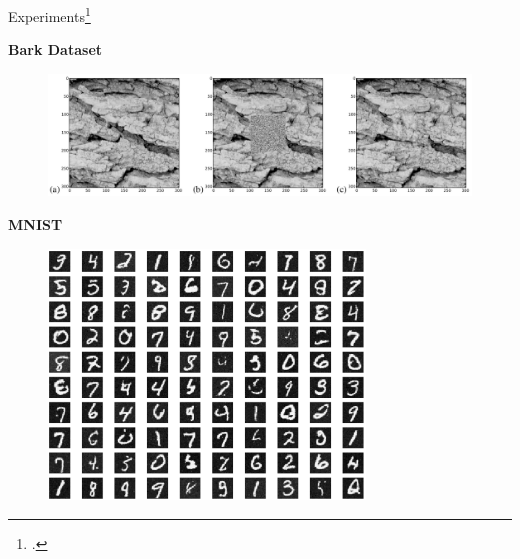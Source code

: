 \documentclass[aspectratio=169, 9pt]{beamer}
\theoremstyle{definition}
\begin{document}
\begin{frame}{Experiments\footcite{thermodynamic}}
  \begin{minipage}[h!]{0.5\textwidth}
    \begin{center}
      \bf
      Bark Dataset
    \end{center}
    \begin{figure}[h!]
      \centering
      \includegraphics[width=\textwidth]{./pic/bark.png}
    \end{figure}
  \end{minipage}\hfill%
  \begin{minipage}[h!]{0.5\textwidth}

    \begin{center}
      \bf MNIST
    \end{center}
    \begin{figure}[h!]
      \centering
      \includegraphics[width=0.75\textwidth]{./pic/mnist_thermo.png}
    \end{figure}
  \end{minipage}
\end{frame}
\end{document}
